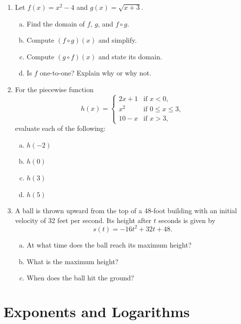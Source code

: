 \documentclass[11pt]{article}
\begin{document}
\begin{enumerate}[resume]
\item Let $f(x) = x^2 - 4$ and $g(x) = \sqrt{x + 3}$.
\begin{enumerate}[(a)]
  \item Find the domain of $f$, $g$, and $f \circ g$.
  \item Compute $(f \circ g)(x)$ and simplify.
  \item Compute $(g \circ f)(x)$ and state its domain.
  \item Is $f$ one-to-one? Explain why or why not.
\end{enumerate}

\item For the piecewise function
\[
  h(x) = \begin{cases}
    2x + 1 & \text{if } x < 0, \\
    x^2     & \text{if } 0 \leq x \leq 3, \\
    10 - x  & \text{if } x > 3,
  \end{cases}
\]
evaluate each of the following:
\begin{enumerate}[(a)]
  \item $h(-2)$
  \item $h(0)$
  \item $h(3)$
  \item $h(5)$
\end{enumerate}

\item A ball is thrown upward from the top of a 48-foot building with an initial velocity of 32 feet per second. Its height after $t$ seconds is given by
\[
  s(t) = -16t^2 + 32t + 48.
\]
\begin{enumerate}[(a)]
  \item At what time does the ball reach its maximum height?
  \item What is the maximum height?
  \item When does the ball hit the ground?
\end{enumerate}
\end{enumerate}

\section*{Exponents and Logarithms}
\end{document}

